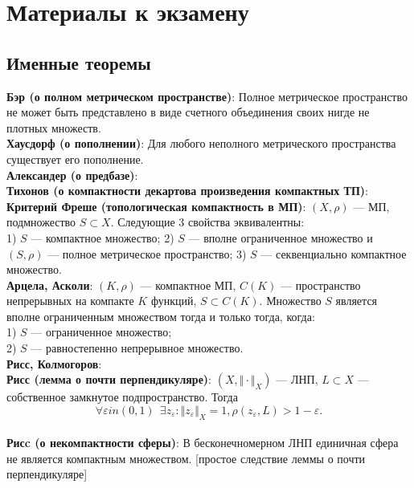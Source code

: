 \documentclass[12pt,a4paper]{scrartcl}
\begin{document}
\section*{Материалы к экзамену}

\subsection*{Именные теоремы}

\textbf{Бэр (о полном метрическом пространстве)}: Полное метрическое пространство не может быть представлено в виде счетного объединения своих нигде не плотных множеств. \\

\textbf{Хаусдорф (о пополнении)}: Для любого неполного метрического пространства существует его пополнение. \\
 
\textbf{Александер (о предбазе)}: \\

\textbf{Тихонов (о компактности декартова произведения компактных ТП)}: \\

\textbf{Критерий Фреше (топологическая компактность в МП)}: $(X, \rho)$ — МП, подмножество $S \subset X.$ Следующие 3 свойства эквивалентны: \\
1) $S$ — компактное множество;
2) $S$ — вполне ограниченное множество и $(S, \rho)$ — полное метрическое пространство;
3) $S$ — секвенциально компактное множество.\\

\textbf{Арцела, Асколи}: $(K, \rho)$ — компактное МП, $C(K)$ — пространство непрерывных на компакте $K$ функций, $S \subset C(K).$ Множество $S$ является вполне ограниченным множеством тогда и только тогда, когда: \\
1) $S$ — ограниченное множество;\\
2) $S$ — равностепенно непрерывное множество.\\

\textbf{Рисс, Колмогоров}: \\

\textbf{Рисс (лемма о почти перпендикуляре)}: $(X, \Vert \cdot \Vert_X)$ — ЛНП, $L \subset X$ — собственное замкнутое подпространство. Тогда 
$$\forall \varepsilon in (0, 1) \ \ \exists z_{\varepsilon}: \Vert z_{\varepsilon}\Vert_X = 1, \rho(z_{\varepsilon}, L) > 1 - \varepsilon.$$\\

\textbf{Рисc (о некомпактности сферы)}: В бесконечномерном ЛНП единичная сфера не является компактным множеством. [простое следствие леммы о почти перпендикуляре]\\
\end{document}
